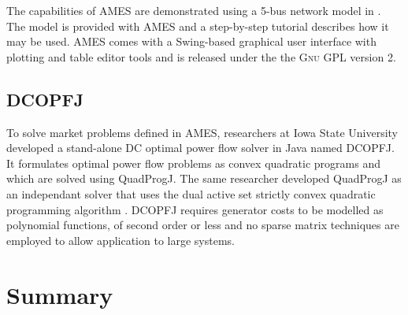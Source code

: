 The capabilities of AMES are demonstrated using a 5-bus network model in
\cite{tesfatsi:pes09}.  The model is provided with AMES and a step-by-step
tutorial describes how it may be used.  AMES comes with a
Swing-based graphical user interface with plotting and table editor tools and
is released under the the \textsc{Gnu} GPL version 2.

\subsection{DCOPFJ}
\label{sec:dcopfj}
To solve market problems defined in AMES, researchers at Iowa State University
developed a stand-alone DC optimal power flow solver in Java named DCOPFJ.
It formulates optimal power flow problems as convex quadratic programs and
which are solved using QuadProgJ.  The same researcher developed QuadProgJ as
an independant solver that uses the dual active set strictly convex quadratic
programming algorithm \cite{goldfarb:scqp}.  DCOPFJ requires
generator costs to be modelled as polynomial functions, of second order or
less and no sparse matrix techniques are employed to allow application to large
systems.


\section{Summary}
